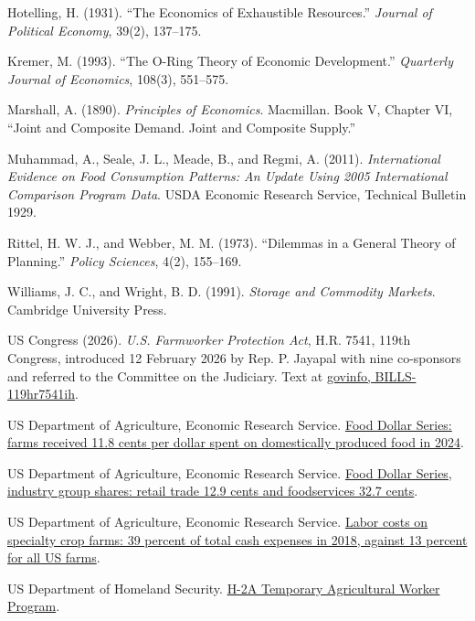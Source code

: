 \documentclass[11pt,a4paper]{article}
\begin{document}
Hotelling, H. (1931). ``The Economics of Exhaustible Resources.'' \emph{Journal of Political Economy}, 39(2), 137--175.

Kremer, M. (1993). ``The O-Ring Theory of Economic Development.'' \emph{Quarterly Journal of Economics}, 108(3), 551--575.

Marshall, A. (1890). \emph{Principles of Economics}. Macmillan. Book V, Chapter VI, ``Joint and Composite Demand. Joint and Composite Supply.''

Muhammad, A., Seale, J. L., Meade, B., and Regmi, A. (2011). \emph{International Evidence on Food Consumption Patterns: An Update Using 2005 International Comparison Program Data}. USDA Economic Research Service, Technical Bulletin 1929.

Rittel, H. W. J., and Webber, M. M. (1973). ``Dilemmas in a General Theory of
Planning.'' \emph{Policy Sciences}, 4(2), 155--169.

Williams, J. C., and Wright, B. D. (1991). \emph{Storage and Commodity Markets}. Cambridge University Press.

US Congress (2026). \emph{U.S. Farmworker Protection Act}, H.R. 7541, 119th Congress, introduced 12 February 2026 by Rep. P. Jayapal with nine co-sponsors and referred to the Committee on the Judiciary. Text at \href{https://www.govinfo.gov/content/pkg/BILLS-119hr7541ih/html/BILLS-119hr7541ih.htm}{govinfo, BILLS-119hr7541ih}.

US Department of Agriculture, Economic Research Service. \href{https://www.ers.usda.gov/data-products/charts-of-note/114074}{Food Dollar Series: farms received 11.8 cents per dollar spent on domestically produced food in 2024}.

US Department of Agriculture, Economic Research Service. \href{https://www.ers.usda.gov/data-products/charts-of-note/78901}{Food Dollar Series, industry group shares: retail trade 12.9 cents and foodservices 32.7 cents}.

US Department of Agriculture, Economic Research Service. \href{https://ers.usda.gov/data-products/charts-of-note/98569}{Labor costs on specialty crop farms: 39 percent of total cash expenses in 2018, against 13 percent for all US farms}.

US Department of Homeland Security. \href{https://www.dhs.gov/h-2a-temporary-agricultural-worker-program}{H-2A Temporary Agricultural Worker Program}.
\end{document}
